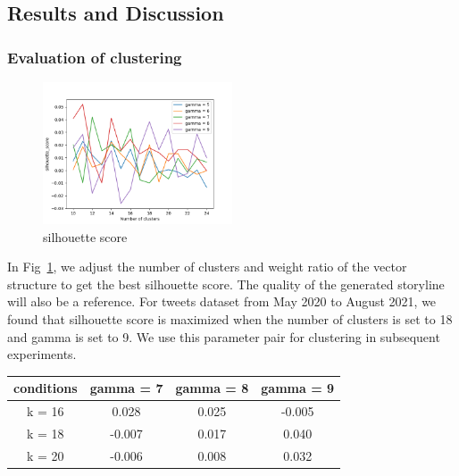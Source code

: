 \subsection{Results and Discussion}
\subsubsection{Evaluation of clustering}

\begin{figure}[h]
\centering
\includegraphics[width=0.5\textwidth]{imgs/silhouette_score.png}
\caption{silhouette score}
\label{fig:silhouette score}
\end{figure}

In Fig~\ref{fig:silhouette score}, we adjust the number of clusters and weight ratio of the vector structure to get the best silhouette score. The quality of the generated storyline will also be a reference. For tweets dataset from May 2020 to August 2021, we found that silhouette score is maximized when the number of clusters is set to 18 and gamma is set to 9. We use this parameter pair for clustering in subsequent experiments.

\begin{table}[]
\begin{tabular}{|c|c|c|c|}
\hline
conditions & gamma = 7 & gamma = 8 & gamma = 9 \\ \hline
k = 16     & 0.028     & 0.025     & -0.005    \\ \hline
k = 18     & -0.007    & 0.017     & 0.040     \\ \hline
k = 20     & -0.006    & 0.008     & 0.032     \\ \hline
\end{tabular}
\end{table}

